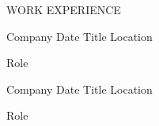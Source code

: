 
\begin{ResumeSection}{WORK EXPERIENCE}

    \begin{DatedField}
        {Company}
        {Date}
        {Title}
        {Location}
        \item Role
    \end{DatedField}
    
    \begin{DatedField}
        {Company}
        {Date}
        {Title}
        {Location}
        \item Role
    \end{DatedField}

\end{ResumeSection} 